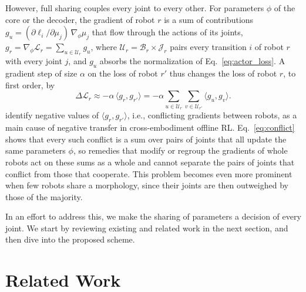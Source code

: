 However, full sharing couples every joint to every other. For parameters $\phi$ of the core or the decoder, the gradient
of robot $r$ is a sum of contributions $g_u=(\partial\ell_i/\partial\mu_j)\,\nabla_{\phi}\mu_j$ that flow through the
actions of its joints, $g_r=\nabla_{\phi}\mathcal{L}_r=\sum_{u\in\mathcal{U}_r}g_u$, where
$\mathcal{U}_r=\mathcal{B}_r\times\mathcal{J}_r$ pairs every transition $i$ of robot $r$ with every joint $j$, and $g_u$
absorbs the normalization of Eq.~\eqref{eq:actor_loss}. A gradient step of size $\alpha$ on the loss of robot $r'$
thus changes the loss of robot $r$, to first order, by
\begin{equation}
\Delta\mathcal{L}_r\approx-\alpha\,\bigl\langle g_r,g_{r'}\bigr\rangle
=-\alpha\sum_{u\in\mathcal{U}_r}\sum_{v\in\mathcal{U}_{r'}}\bigl\langle g_u,g_v\bigr\rangle .
\label{eq:conflict}
\end{equation}
\citet{abe2026crossembodimentoffline} identify negative values of $\langle g_r,g_{r'}\rangle$, i.e., conflicting
gradients between robots, as a main cause of negative transfer in cross-embodiment offline RL. Eq.~\eqref{eq:conflict}
shows that every such conflict is a sum over pairs of joints that all update the same parameters $\phi$, so remedies that
modify or regroup the gradients of whole robots act on these sums as a whole and cannot separate the pairs of joints that
conflict from those that cooperate. This problem becomes even more prominent when few robots share a morphology, since
their joints are then outweighed by those of the majority.

In an effort to address this, we make the sharing of parameters a decision of every joint. We start by reviewing
existing and related work in the next section, and then dive into the proposed scheme.

\section{Related Work}
\label{sec:related}

